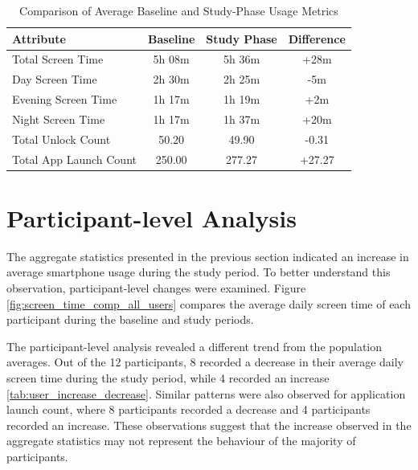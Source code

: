 \documentclass[11pt]{report}
\begin{document}
\begin{table}[H]
\centering
\caption{Comparison of Average Baseline and Study-Phase Usage Metrics}
\label{tab:average_usage_comparison}
\begin{tabular}{|l|c|c|c|}
\hline
\textbf{Attribute} &
\textbf{Baseline} &
\textbf{Study Phase} &
\textbf{Difference} \\
\hline

Total Screen Time &
5h 08m &
5h 36m &
+28m \\
\hline

Day Screen Time &
2h 30m &
2h 25m &
-5m \\
\hline

Evening Screen Time &
1h 17m &
1h 19m &
+2m \\
\hline

Night Screen Time &
1h 17m &
1h 37m &
+20m \\
\hline

Total Unlock Count &
50.20 &
49.90 &
-0.31 \\
\hline

Total App Launch Count &
250.00 &
277.27 &
+27.27 \\
\hline

\end{tabular}
\end{table}



\section{Participant-level Analysis}

The aggregate statistics presented in the previous section indicated an increase in 
average smartphone usage during the study period. To better understand this 
observation, participant-level changes were examined. Figure \ref{fig:screen_time_comp_all_users} compares the 
average daily screen time of each participant during the baseline and study periods.

The participant-level analysis revealed a different trend from the population averages. 
Out of the 12 participants, 8 recorded a decrease in their average daily screen time 
during the study period, while 4 recorded an increase \ref{tab:user_increase_decrease}. Similar patterns were also 
observed for application launch count, where 8 participants recorded a decrease and 
4 participants recorded an increase. These observations suggest that the increase 
observed in the aggregate statistics may not represent the behaviour of the majority 
of participants.
\end{document}
